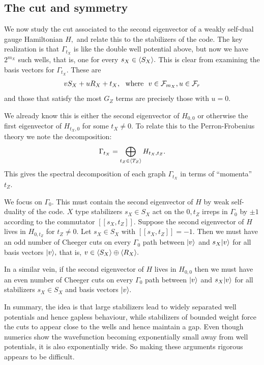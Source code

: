 \documentclass[12pt]{article}
\newcommand{\Field}{\mathcal{F}}
\begin{document}
\subsection{The cut and symmetry}

We now study 
the cut associated to the second eigenvector of a 
weakly self-dual gauge Hamiltonian $H,$
and relate this to the stabilizers of the code.
The key realization is that $\Gamma_{t_X}$ is like
the double well potential above,
but now we have $2^{m_X}$ such wells,
that is, one for every $s_X\in \langle S_X \rangle.$
This is clear from examining the basis vectors for $\Gamma_{t_X}.$
These are 
$$
    v S_X + u R_X + t_X, \smbox{where} v\in \Field_{m_X}, u\in\Frd
$$
and those that satisfy the most $G_Z$ terms are
precisely those with $u=0.$

We already know this is either the second eigenvector of $H_{0,0}$
or otherwise the first eigenvector of $H_{t_X,0}$ for some $t_X \ne 0.$
To relate this to the Perron-Frobenius theory we note the 
decomposition:
$$
    \Gamma_{t_X} = \bigoplus_{t_Z\in\langle T_Z \rangle} H_{t_X, t_Z}.
$$
This gives the spectral decomposition of each graph $\Gamma_{t_X}$ 
in terms of ``momenta'' $t_Z.$

We focus on $\Gamma_0.$
This must contain the second eigenvector of $H$ by weak self-duality of the code.
$X$ type stabilizers $s_X\in S_X$ act on the $0,t_Z$ irreps in $\Gamma_0$
by $\pm 1$ according to the commutator $[[s_X, t_Z]].$
Suppose the second eigenvector of $H$ lives in
$H_{0,t_Z}$ for $t_Z\ne 0$. 
Let $s_X\in S_X$ with $[[s_X, t_Z]]=-1.$
Then we must have an odd number of Cheeger cuts 
on every $\Gamma_0$ path between $|{v}\rangle$ and $s_X|{v}\rangle$ for all basis
vectors $|{v}\rangle,$ that is, $v\in\langle S_X \rangle\oplus\langle R_X \rangle.$

In a similar vein, if the second eigenvector of $H$ lives in $H_{0,0}$
then we must have an even number of Cheeger cuts 
on every $\Gamma_0$ path between $|{v}\rangle$ and $s_X|{v}\rangle$ for all stabilizers $s_X\in S_X$
and basis vectors $|{v}\rangle.$

In summary, the idea is that large stabilizers lead to
widely separated well potentials and hence gapless behaviour,
while stabilizers of bounded weight force the cuts to
appear close to the wells and hence maintain a gap.
Even though numerics show the wavefunction becoming 
exponentially small away from well potentials,
it is also exponentially wide.
So making these arguments rigorous appears to be difficult.
\end{document}
